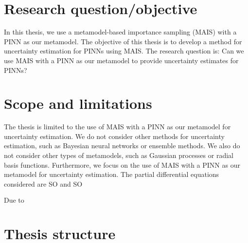 \section{Research question/objective} 
In this thesis, we use a metamodel-based importance sampling (MAIS) with a PINN as our metamodel. The objective of this thesis is to develop a method for uncertainty estimation for PINNs using MAIS. The research question is: Can we use MAIS with a PINN as our metamodel to provide uncertainty estimates for PINNs?


\section{Scope and limitations}

The thesis is limited to the use of MAIS with a PINN as our metamodel for uncertainty estimation. We do not consider other methods for uncertainty estimation, such as Bayesian neural networks or ensemble methods. We also do not consider other types of metamodels, such as Gaussian processes or radial basis functions. Furthermore, we focus on the use of MAIS with a PINN as our metamodel for uncertainty estimation. The partial differential equations considered are SO and SO

Due to 

\section{Thesis structure}



